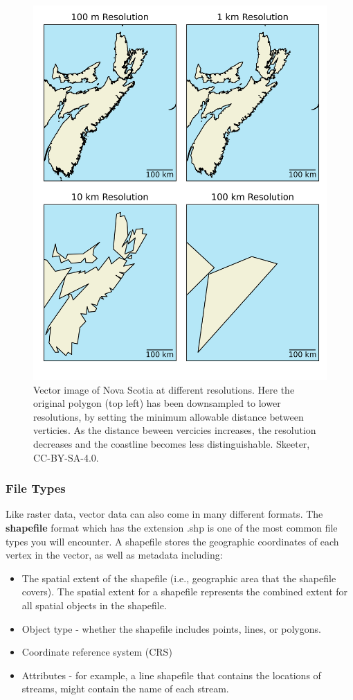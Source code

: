 \documentclass[
]{book}
\providecommand{\tightlist}{%
  \setlength{\itemsep}{0pt}\setlength{\parskip}{0pt}}
\begin{document}
\begin{figure}
\includegraphics[width=0.75\linewidth]{images/03-vector-resolution} \caption{Vector image of Nova Scotia at different resolutions.  Here the original polygon (top left) has been downsampled to lower resolutions, by setting the minimum allowable distance between verticies.  As the distance beween vercicies increases, the resolution decreases and the coastline becomes less distinguishable. Skeeter, CC-BY-SA-4.0.}\label{fig:3-vector-resolution}
\end{figure}

\subsubsection{File Types}\label{file-types}

Like raster data, vector data can also come in many different formats. The \textbf{shapefile} format which has the extension .shp is one of the most common file types you will encounter. A shapefile stores the geographic coordinates of each vertex in the vector, as well as metadata including:

\begin{itemize}
\tightlist
\item
  The spatial extent of the shapefile (i.e., geographic area that the shapefile covers). The spatial extent for a shapefile represents the combined extent for all spatial objects in the shapefile.
\item
  Object type - whether the shapefile includes points, lines, or polygons.
\item
  Coordinate reference system (CRS)
\item
  Attributes - for example, a line shapefile that contains the locations of streams, might contain the name of each stream.
\end{itemize}
\end{document}
